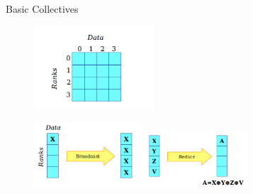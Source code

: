 \begin{frame}[fragile]{Basic Collectives}
  \vspace{-5mm}
\begin{figure}
    \centering
    \includegraphics[width=0.4\textwidth]{img/collectivesMPI-1.png}
\end{figure} 
 \vspace{-5mm}

 
\begin{figure}
\includegraphics[width=0.35\textwidth]{img/MPI_Broadcast.png} 
\hfill
\includegraphics[width=0.35\textwidth]{img/MPI_Reduce.png}

\end{figure}


 

\end{frame}



